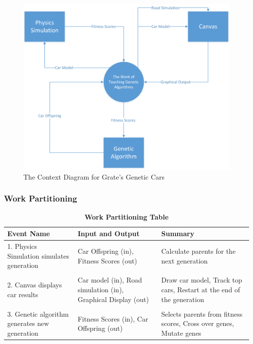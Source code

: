 \documentclass[12pt, titlepage]{article}
\begin{document}
\begin{figure}[H]
  \includegraphics[scale=0.66]{ContextDiagram.png}
  \caption{The Context Diagram for Grate's Genetic Cars}
\end{figure}

\subsubsection{Work Partitioning}
\begin{table}[H]
\begin{tabularx}{\textwidth}{p{4cm}p{4cm}X}
\toprule {\bf Event Name} & {\bf Input and Output} & {\bf Summary}\\
\midrule
1. Physics Simulation simulates generation & Car Offspring (in), Fitness Scores 
(out) & Calculate parents for the next generation\\
& & \\
2. Canvas displays car results & Car model (in), Road simulation (in), Graphical 
Display (out) & Draw car model, Track top cars, Restart at the end of the 
generation\\
& & \\
3. Genetic algorithm generates new generation & Fitness Scores (in), Car 
Offspring (out) & Selects parents from fitness scores, Cross over genes, Mutate 
genes\\
\bottomrule
\end{tabularx}
\caption{\bf Work Partitioning Table}
\end{table}
\end{document}
